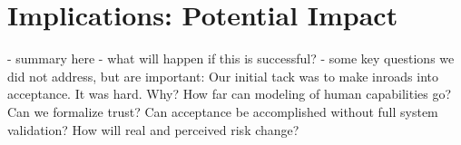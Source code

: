 
\section*{Implications: Potential Impact}


- summary here
- what will happen if this is successful?
- some key questions we did not address, but are important:
Our initial tack was to make inroads into acceptance.  It was hard.  Why?
How far can modeling of human capabilities go? 
Can we formalize trust?
Can acceptance be accomplished without full system validation?
How will real and perceived risk change?

